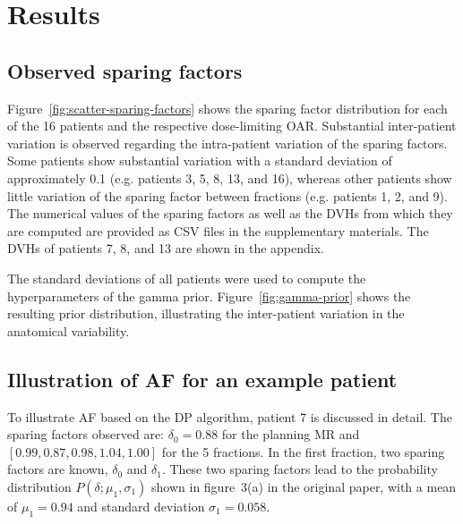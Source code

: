 \documentclass[11pt]{article}
\begin{document}
\section{Results}

\subsection{Observed sparing factors}

Figure~\ref{fig:scatter-sparing-factors} shows the sparing factor distribution for each of the 16 patients and the respective dose-limiting OAR. Substantial inter-patient variation is observed regarding the intra-patient variation of the sparing factors. Some patients show substantial variation with a standard deviation of approximately 0.1 (e.g. patients 3, 5, 8, 13, and 16), whereas other patients show little variation of the sparing factor between fractions (e.g. patients 1, 2, and 9). The numerical values of the sparing factors as well as the DVHs from which they are computed are provided as CSV files in the supplementary materials. The DVHs of patients 7, 8, and 13 are shown in the appendix.

The standard deviations of all patients were used to compute the hyperparameters of the gamma prior. Figure~\ref{fig:gamma-prior} shows the resulting prior distribution, illustrating the inter-patient variation in the anatomical variability.

\subsection{Illustration of AF for an example patient}

To illustrate AF based on the DP algorithm, patient 7 is discussed in detail. The sparing factors observed are: $\delta_0 = 0.88$ for the planning MR and $[0.99, 0.87, 0.98, 1.04, 1.00]$ for the 5 fractions. In the first fraction, two sparing factors are known, $\delta_0$ and $\delta_1$. These two sparing factors lead to the probability distribution $P(\delta; \mu_1, \sigma_1)$ shown in figure~3(a) in the original paper, with a mean of $\mu_1 = 0.94$ and standard deviation $\sigma_1 = 0.058$.
\end{document}
